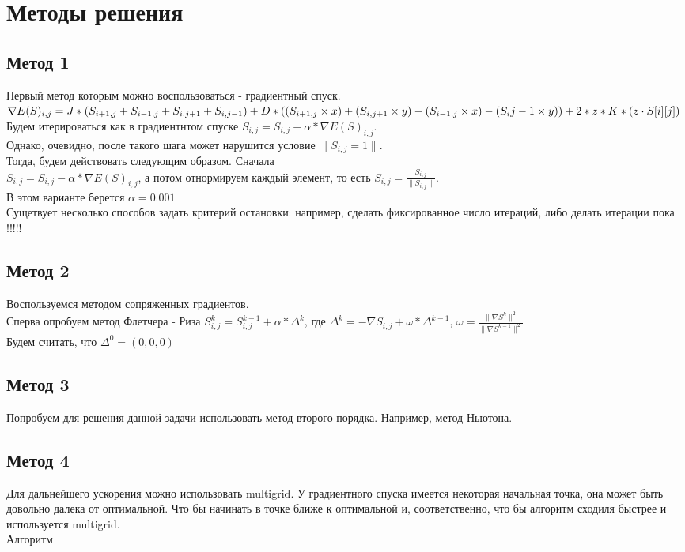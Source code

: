 \documentclass[ 12pt,x11names]{article}
\begin{document}
    \section{Методы решения}
    \subsection{Метод 1}
    Первый метод которым можно воспользоваться  - градиентный спуск.
    $\nabla E(S)_{i, j} = J * (S_{i + 1,j} + S_{i - 1,j} + S_{i, j + 1} + S_{i, j - 1})
        + \\ D * ( (S_{i + 1,j} \times x) + (S_{i, j + 1} \times y) -  (S_{i - 1, j} \times x) - (S_{i}{j - 1} \times y) )
        + 2 * z * K * (z \cdot S[i][j])$\\
    Будем  итерироваться как в градиентнтом спуске $S_{i, j} = S_{i, j} - \alpha * \nabla E(S)_{i, j}$.\\
    Однако, очевидно, после такого шага может  нарушится условие $\|S_{i, j} = 1\|$.\\
    Тогда, будем действовать следующим образом. Сначала \\$S_{i, j} = S_{i, j} - \alpha * \nabla E(S)_{i, j}$, а потом отнормируем каждый элемент, то есть $S_{i, j} = \frac{S_{i, j}}{\|S_{i, j}\|}$.\\
    В этом варианте берется $\alpha = 0.001$\\
    Сущетвует несколько способов задать критерий остановки: например, сделать фиксированное число итераций, либо делать итерации пока !!!!!
    \subsection{Метод 2}
    Воспользуемся методом сопряженных градиентов.\\
    Сперва опробуем метод Флетчера - Риза
    $S^k_{i, j} = S^{k-1}_{i, j} + \alpha * \Delta^k $, где $\Delta^k = -\nabla S_{i, j} + \omega * \Delta ^  {k-1} $,
    $\omega  = \frac{\| \nabla S^k \|^2}{\| \nabla S^{k-1} \|^2}$\\
    Будем считать, что $\Delta^0=(0,0,0)$
    \subsection{Метод 3}
    Попробуем для решения данной задачи использовать метод второго порядка. Например, метод Ньютона.

    \subsection{Метод 4}
    Для дальнейшего ускорения можно использовать multigrid.
    У градиентного спуска имеется некоторая начальная точка, она может быть довольно далека от оптимальной.
    Что бы начинать в точке ближе к оптимальной и, соответственно, что бы алгоритм сходиля быстрее и  используется multigrid.\\
    Алгоритм
\end{document}
